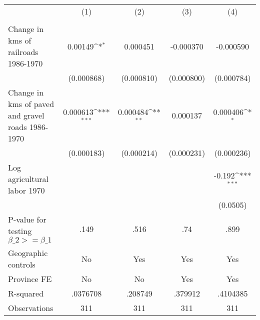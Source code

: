 {
\def\sym#1{\ifmmode^{#1}\else\(^{#1}\)\fi}
\begin{tabular}{l*{4}{c}}
\hline\hline
                &\multicolumn{1}{c}{(1)}&\multicolumn{1}{c}{(2)}&\multicolumn{1}{c}{(3)}&\multicolumn{1}{c}{(4)}\\
                &\multicolumn{1}{c}{}&\multicolumn{1}{c}{}&\multicolumn{1}{c}{}&\multicolumn{1}{c}{}\\
\hline
Change in kms of railroads 1986-1970&  0.00149\sym{*}  & 0.000451         &-0.000370         &-0.000590         \\
                &(0.000868)         &(0.000810)         &(0.000800)         &(0.000784)         \\
[1em]
Change in kms of paved and gravel roads 1986-1970& 0.000613\sym{***}& 0.000484\sym{**} & 0.000137         & 0.000406\sym{*}  \\
                &(0.000183)         &(0.000214)         &(0.000231)         &(0.000236)         \\
[1em]
Log agricultural labor 1970&                  &                  &                  &   -0.192\sym{***}\\
                &                  &                  &                  & (0.0505)         \\
\hline
P-value for testing $\beta\_{2} >= \beta\_{1}$&     .149         &     .516         &      .74         &     .899         \\
Geographic controls&       No         &      Yes         &      Yes         &      Yes         \\
Province FE     &       No         &       No         &      Yes         &      Yes         \\
R-squared       & .0376708         &  .208749         &  .379912         & .4104385         \\
Observations    &      311         &      311         &      311         &      311         \\
\hline\hline
\end{tabular}
}

